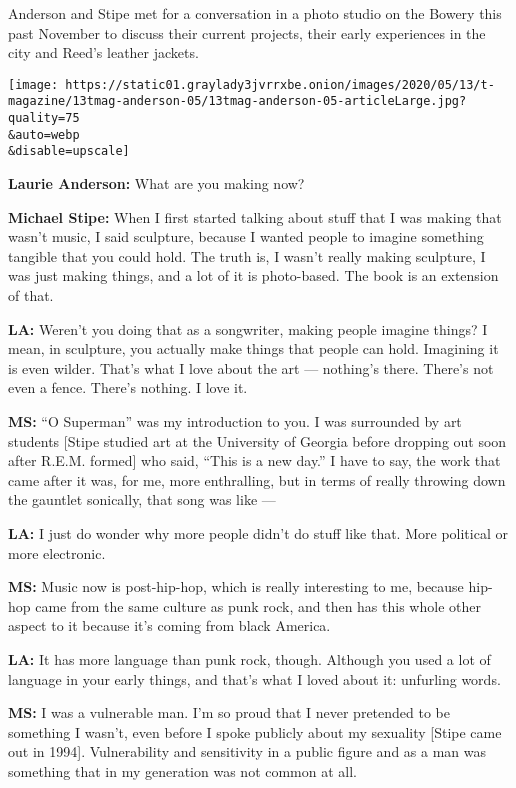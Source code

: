 Anderson and Stipe met for a conversation in a photo studio on the
Bowery this past November to discuss their current projects, their early
experiences in the city and Reed's leather jackets.

\texttt{[image: https://static01.graylady3jvrrxbe.onion/images/2020/05/13/t-magazine/13tmag-anderson-05/13tmag-anderson-05-articleLarge.jpg?quality=75\\\&auto=webp\\\&disable=upscale]}

\textbf{Laurie Anderson:} What are you making now?

\textbf{Michael Stipe:} When I first started talking about stuff that I
was making that wasn't music, I said sculpture, because I wanted people
to imagine something tangible that you could hold. The truth is, I
wasn't really making sculpture, I was just making things, and a lot of
it is photo-based. The book is an extension of that.

\textbf{LA:} Weren't you doing that as a songwriter, making people
imagine things? I mean, in sculpture, you actually make things that
people can hold. Imagining it is even wilder. That's what I love about
the art --- nothing's there. There's not even a fence. There's nothing.
I love it.

\textbf{MS:} ``O Superman'' was my introduction to you. I was surrounded
by art students {[}Stipe studied art at the University of Georgia before
dropping out soon after R.E.M. formed{]} who said, ``This is a new
day.'' I have to say, the work that came after it was, for me, more
enthralling, but in terms of really throwing down the gauntlet
sonically, that song was like ---

\textbf{LA:} I just do wonder why more people didn't do stuff like that.
More political or more electronic.

\textbf{MS:} Music now is post-hip-hop, which is really interesting to
me, because hip-hop came from the same culture as punk rock, and then
has this whole other aspect to it because it's coming from black
America.

\textbf{LA:} It has more language than punk rock, though. Although you
used a lot of language in your early things, and that's what I loved
about it: unfurling words.

\textbf{MS:} I was a vulnerable man. I'm so proud that I never pretended
to be something I wasn't, even before I spoke publicly about my
sexuality {[}Stipe came out in 1994{]}. Vulnerability and sensitivity in
a public figure and as a man was something that in my generation was not
common at all.

